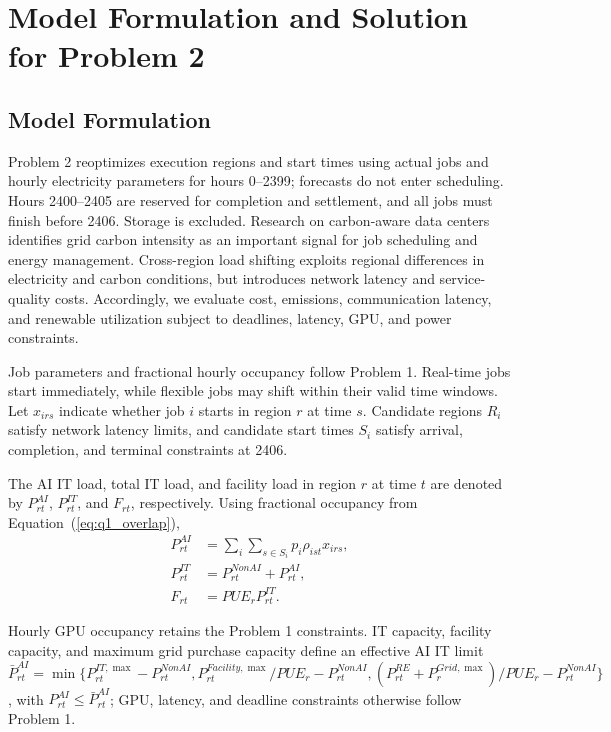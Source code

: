 \section{Model Formulation and Solution for Problem 2}

\subsection{Model Formulation}

Problem 2 reoptimizes execution regions and start times using actual jobs and hourly electricity parameters for hours 0--2399; forecasts do not enter scheduling. Hours 2400--2405 are reserved for completion and settlement, and all jobs must finish before 2406. Storage is excluded.
Research on carbon-aware data centers identifies grid carbon intensity as an important signal for job scheduling and energy management\cite{ref5}.
Cross-region load shifting exploits regional differences in electricity and carbon conditions,
but introduces network latency and service-quality costs\cite{ref6}.
Accordingly, we evaluate cost, emissions, communication latency, and renewable utilization subject to deadlines, latency, GPU, and power constraints.

Job parameters and fractional hourly occupancy follow Problem 1. Real-time jobs start immediately, while flexible jobs may shift within their valid time windows.
Let $x_{irs}$ indicate whether job $i$ starts in region $r$ at time $s$.
Candidate regions $R_i$ satisfy network latency limits,
and candidate start times $S_i$ satisfy arrival, completion, and terminal constraints at 2406.

The AI IT load, total IT load, and facility load in region $r$ at time $t$ are denoted by
$P^{AI}_{rt}$, $P^{IT}_{rt}$, and $F_{rt}$, respectively.
Using fractional occupancy from Equation~(\ref{eq:q1_overlap}),
\begin{equation}
	\begin{aligned}
		P^{AI}_{rt}
		&=
		\sum_i\sum_{s\in S_i}
		p_i\rho_{ist}x_{irs},\\
		P^{IT}_{rt}
		&=
		P^{NonAI}_{rt}+P^{AI}_{rt},\\
		F_{rt}
		&=
		PUE_rP^{IT}_{rt}.
	\end{aligned}
	\label{eq:q2_load_mapping}
\end{equation}

Hourly GPU occupancy retains the Problem 1 constraints. IT capacity, facility capacity, and maximum grid purchase capacity define an effective AI IT limit
$\bar P^{AI}_{rt}
=\min\{P^{IT,\max}_{rt}-P^{NonAI}_{rt},
P^{Facility,\max}_{rt}/PUE_r-P^{NonAI}_{rt},
(P^{RE}_{rt}+P_r^{Grid,\max})/PUE_r-P^{NonAI}_{rt}\}$,
with $P^{AI}_{rt}\leq\bar P^{AI}_{rt}$; GPU, latency, and deadline constraints otherwise follow Problem 1.

